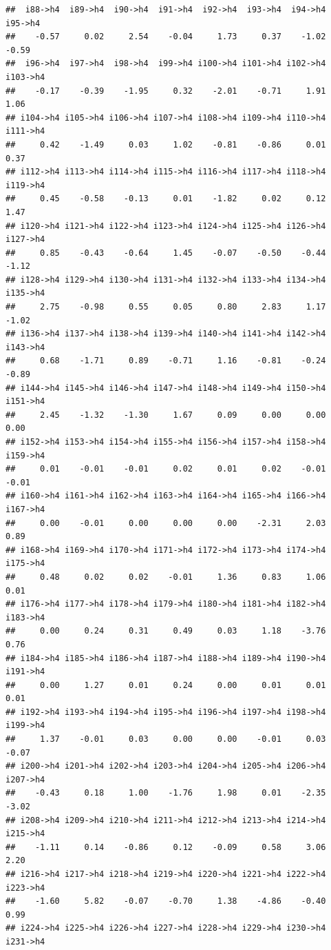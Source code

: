 \documentclass[
]{article}
\begin{document}
\begin{verbatim}
##  i88->h4  i89->h4  i90->h4  i91->h4  i92->h4  i93->h4  i94->h4  i95->h4 
##    -0.57     0.02     2.54    -0.04     1.73     0.37    -1.02    -0.59 
##  i96->h4  i97->h4  i98->h4  i99->h4 i100->h4 i101->h4 i102->h4 i103->h4 
##    -0.17    -0.39    -1.95     0.32    -2.01    -0.71     1.91     1.06 
## i104->h4 i105->h4 i106->h4 i107->h4 i108->h4 i109->h4 i110->h4 i111->h4 
##     0.42    -1.49     0.03     1.02    -0.81    -0.86     0.01     0.37 
## i112->h4 i113->h4 i114->h4 i115->h4 i116->h4 i117->h4 i118->h4 i119->h4 
##     0.45    -0.58    -0.13     0.01    -1.82     0.02     0.12     1.47 
## i120->h4 i121->h4 i122->h4 i123->h4 i124->h4 i125->h4 i126->h4 i127->h4 
##     0.85    -0.43    -0.64     1.45    -0.07    -0.50    -0.44    -1.12 
## i128->h4 i129->h4 i130->h4 i131->h4 i132->h4 i133->h4 i134->h4 i135->h4 
##     2.75    -0.98     0.55     0.05     0.80     2.83     1.17    -1.02 
## i136->h4 i137->h4 i138->h4 i139->h4 i140->h4 i141->h4 i142->h4 i143->h4 
##     0.68    -1.71     0.89    -0.71     1.16    -0.81    -0.24    -0.89 
## i144->h4 i145->h4 i146->h4 i147->h4 i148->h4 i149->h4 i150->h4 i151->h4 
##     2.45    -1.32    -1.30     1.67     0.09     0.00     0.00     0.00 
## i152->h4 i153->h4 i154->h4 i155->h4 i156->h4 i157->h4 i158->h4 i159->h4 
##     0.01    -0.01    -0.01     0.02     0.01     0.02    -0.01    -0.01 
## i160->h4 i161->h4 i162->h4 i163->h4 i164->h4 i165->h4 i166->h4 i167->h4 
##     0.00    -0.01     0.00     0.00     0.00    -2.31     2.03     0.89 
## i168->h4 i169->h4 i170->h4 i171->h4 i172->h4 i173->h4 i174->h4 i175->h4 
##     0.48     0.02     0.02    -0.01     1.36     0.83     1.06     0.01 
## i176->h4 i177->h4 i178->h4 i179->h4 i180->h4 i181->h4 i182->h4 i183->h4 
##     0.00     0.24     0.31     0.49     0.03     1.18    -3.76     0.76 
## i184->h4 i185->h4 i186->h4 i187->h4 i188->h4 i189->h4 i190->h4 i191->h4 
##     0.00     1.27     0.01     0.24     0.00     0.01     0.01     0.01 
## i192->h4 i193->h4 i194->h4 i195->h4 i196->h4 i197->h4 i198->h4 i199->h4 
##     1.37    -0.01     0.03     0.00     0.00    -0.01     0.03    -0.07 
## i200->h4 i201->h4 i202->h4 i203->h4 i204->h4 i205->h4 i206->h4 i207->h4 
##    -0.43     0.18     1.00    -1.76     1.98     0.01    -2.35    -3.02 
## i208->h4 i209->h4 i210->h4 i211->h4 i212->h4 i213->h4 i214->h4 i215->h4 
##    -1.11     0.14    -0.86     0.12    -0.09     0.58     3.06     2.20 
## i216->h4 i217->h4 i218->h4 i219->h4 i220->h4 i221->h4 i222->h4 i223->h4 
##    -1.60     5.82    -0.07    -0.70     1.38    -4.86    -0.40     0.99 
## i224->h4 i225->h4 i226->h4 i227->h4 i228->h4 i229->h4 i230->h4 i231->h4 

\end{verbatim}
\end{document}
